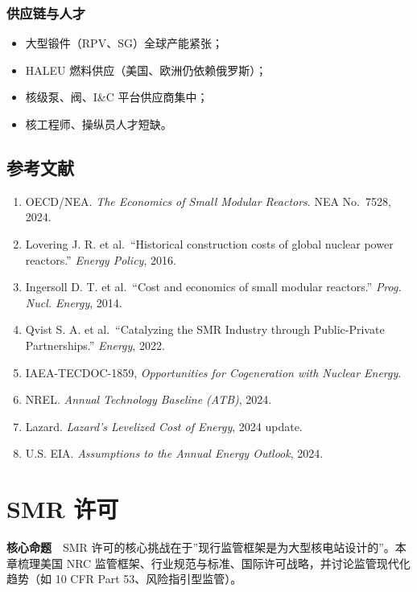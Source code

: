 \documentclass[
  UTF8,
  scheme=plain,
  fontsize=10pt,
  openany
]{ctexbook}
\begin{document}
\subsection{供应链与人才}\label{ux4f9bux5e94ux94feux4e0eux4ebaux624d}

\begin{itemize}
\tightlist
\item
  大型锻件（RPV、SG）全球产能紧张；
\item
  HALEU 燃料供应（美国、欧洲仍依赖俄罗斯）；
\item
  核级泵、阀、I\&C 平台供应商集中；
\item
  核工程师、操纵员人才短缺。
\end{itemize}

\section{参考文献}\label{ux53c2ux8003ux6587ux732e-9}

\begin{enumerate}
\def\labelenumi{\arabic{enumi}.}
\tightlist
\item
  OECD/NEA. \emph{The Economics of Small Modular Reactors}. NEA
  No.~7528, 2024.
\item
  Lovering J. R. et al.~``Historical construction costs of global
  nuclear power reactors.'' \emph{Energy Policy}, 2016.
\item
  Ingersoll D. T. et al.~``Cost and economics of small modular
  reactors.'' \emph{Prog. Nucl. Energy}, 2014.
\item
  Qvist S. A. et al.~``Catalyzing the SMR Industry through
  Public-Private Partnerships.'' \emph{Energy}, 2022.
\item
  IAEA-TECDOC-1859, \emph{Opportunities for Cogeneration with Nuclear
  Energy}.
\item
  NREL. \emph{Annual Technology Baseline (ATB)}, 2024.
\item
  Lazard. \emph{Lazard's Levelized Cost of Energy}, 2024 update.
\item
  U.S. EIA. \emph{Assumptions to the Annual Energy Outlook}, 2024.
\end{enumerate}

\cleardoublepage

\chapter{SMR 许可}\label{smr-ux8bb8ux53ef}

\begin{epigraph}

\textbf{核心命题}　SMR
许可的核心挑战在于''现行监管框架是为大型核电站设计的''。本章梳理美国 NRC
监管框架、行业规范与标准、国际许可战略，并讨论监管现代化趋势（如 10 CFR
Part 53、风险指引型监管）。

\end{epigraph}
\end{document}
